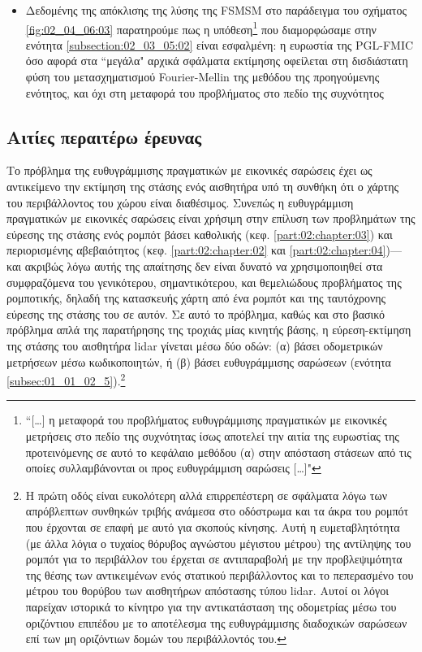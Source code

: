\begin{itemize}
  \item Δεδομένης της απόκλισης της λύσης της FSMSM στο παράδειγμα του σχήματος
        \ref{fig:02_04_06:03} παρατηρούμε πως η υπόθεση\footnote{``[\dots] η
        μεταφορά του προβλήματος ευθυγράμμισης πραγματικών με εικονικές
        μετρήσεις στο πεδίο της συχνότητας ίσως αποτελεί την αιτία της
        ευρωστίας της προτεινόμενης σε αυτό το κεφάλαιο μεθόδου (α) στην
        απόσταση στάσεων από τις οποίες συλλαμβάνονται οι προς ευθυγράμμιση
        σαρώσεις [\dots]"} που διαμορφώσαμε στην ενότητα
        \ref{subsection:02_03_05:02} είναι εσφαλμένη: η ευρωστία της PGL-FMIC
        όσο αφορά στα ``μεγάλα" αρχικά σφάλματα εκτίμησης οφείλεται στη
        δισδιάστατη φύση του μετασχηματισμού Fourier-Mellin της μεθόδου της
        προηγούμενης ενότητος, και όχι στη μεταφορά του προβλήματος στο πεδίο
        της συχνότητος
\end{itemize}


\subsection{Αιτίες περαιτέρω έρευνας}
\label{subsection:02_04_07:02}

Το πρόβλημα της ευθυγράμμισης πραγματικών με εικονικές σαρώσεις έχει ως
αντικείμενο την εκτίμηση της στάσης ενός αισθητήρα υπό τη συνθήκη ότι ο χάρτης
του περιβάλλοντος του χώρου είναι διαθέσιμος. Συνεπώς η ευθυγράμμιση
πραγματικών με εικονικές σαρώσεις είναι χρήσιμη στην επίλυση των προβλημάτων
της εύρεσης της στάσης ενός ρομπότ βάσει καθολικής (κεφ.
\ref{part:02:chapter:03}) και περιορισμένης αβεβαιότητος (κεφ.
\ref{part:02:chapter:02} και \ref{part:02:chapter:04})---και ακριβώς λόγω αυτής
της απαίτησης δεν είναι δυνατό να χρησιμοποιηθεί στα συμφραζόμενα του
γενικότερου, σημαντικότερου, και θεμελιώδους προβλήματος της ρομποτικής, δηλαδή
της κατασκευής χάρτη από ένα ρομπότ και της ταυτόχρονης εύρεσης της στάσης του
σε αυτόν. Σε αυτό το πρόβλημα, καθώς και στο βασικό πρόβλημα απλά της
παρατήρησης της τροχιάς μίας κινητής βάσης, η εύρεση-εκτίμηση της στάσης του
αισθητήρα lidar γίνεται μέσω δύο οδών: (α) βάσει οδομετρικών μετρήσεων μέσω
κωδικοποιητών, ή (β) βάσει ευθυγράμμισης σαρώσεων (ενότητα
\ref{subsec:01_01_02_5}).\footnote{Η πρώτη οδός είναι ευκολότερη αλλά
επιρρεπέστερη σε σφάλματα λόγω των απρόβλεπτων συνθηκών τριβής ανάμεσα στο
οδόστρωμα και τα άκρα του ρομπότ που έρχονται σε επαφή με αυτό για σκοπούς
κίνησης. Αυτή η ευμεταβλητότητα (με άλλα λόγια ο τυχαίος θόρυβος αγνώστου
μέγιστου μέτρου) της αντίληψης του ρομπότ για το περιβάλλον του έρχεται σε
αντιπαραβολή με την προβλεψιμότητα της θέσης των αντικειμένων ενός στατικού
περιβάλλοντος και το πεπερασμένο του μέτρου του θορύβου των αισθητήρων
απόστασης τύπου lidar. Αυτοί οι λόγοι παρείχαν ιστορικά το κίνητρο για την
αντικατάσταση της οδομετρίας μέσω του οριζόντιου επιπέδου με το αποτέλεσμα της
ευθυγράμμισης διαδοχικών σαρώσεων επί των μη οριζόντιων δομών του περιβάλλοντός
του.}

